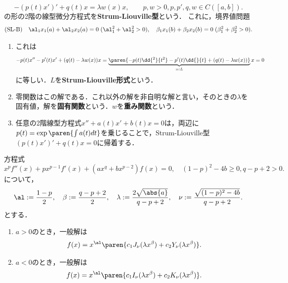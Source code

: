 \documentclass[uplatex,dvipdfmx]{jsreport}
\begin{document}
\begin{problem}
    \[-(p(t)x')'+q(t)x=\lambda w(x)x,\qquad p,w>0,p,p',q,w\in C([a,b]).\]
    の形の2階の線型微分方程式を\textbf{Strum-Liouville型}という．
    これに，境界値問題
    \[\text{(SL-B)}\quad \al_1x_1(a)+\al_2x_2(a)=0\;(\al_1^2+\al_2^2>0),\quad\beta_1x_1(b)+\beta_2x_2(b)=0\;(\beta_1^2+\beta_2^2>0).\]
    \begin{enumerate}
        \item これは
        \[-p(t)x''-p'(t)x'+(q(t)-\lambda w(x))x=\underbrace{\paren{-p(t)\dd{^2}{t^2}-p'(t)\dd{}{t}+(q(t)-\lambda w(x))}}_{=:L}x=0\]
        に等しい．$L$を\textbf{Strum-Liouville形式}という．
        \item 零関数はこの解である．これ以外の解を非自明な解と言い，そのときの$\lambda$を固有値，解を\textbf{固有関数}という．$w$を\textbf{重み関数}という．
        \item 任意の2階線型方程式$x''+a(t)x'+b(t)x=0$は，両辺に$p(t)=\exp\paren{\int a(t)dt}$を乗じることで，Strum-Liouville型$(p(t)x')'+q(t)x=0$に帰着する．
    \end{enumerate}
\end{problem}


\begin{theorem}
    方程式
    \[x^pf''(x)+px^{p-1}f'(x)+(ax^q+bx^{p-2})f(x)=0,\quad(1-p)^2-4b\ge0,q-p+2>0.\]
    について，
    \[\al:=\frac{1-p}{2},\quad\beta:=\frac{q-p+2}{2},\quad\lambda:=\frac{2\sqrt{\abs{a}}}{q-p+2},\quad\nu:=\frac{\sqrt{(1-p)^2-4b}}{q-p+2}.\]
    とする．
    \begin{enumerate}
        \item $a>0$のとき，一般解は
        \[f(x)=x^\al\paren{c_1J_\nu(\lambda x^\beta)+c_2Y_\nu(\lambda x^\beta)}.\]
        \item $a<0$のとき，一般解は
        \[f(x)=x^\al\paren{c_1I_\nu(\lambda x^\beta)+c_2K_\nu(\lambda x^\beta)}.\]
    \end{enumerate}
\end{theorem}
\end{document}
